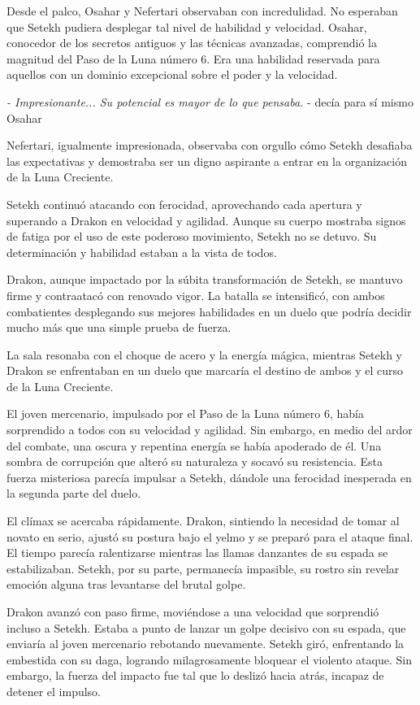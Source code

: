 Desde el palco, Osahar y Nefertari observaban con incredulidad. No esperaban que Setekh pudiera desplegar tal nivel de habilidad y velocidad. Osahar, conocedor de los secretos antiguos y las técnicas avanzadas, comprendió la magnitud del Paso de la Luna número 6. Era una habilidad reservada para aquellos con un dominio excepcional sobre el poder y la velocidad.

\textit{- Impresionante... Su potencial es mayor de lo que pensaba.} - decía para sí mismo Osahar

Nefertari, igualmente impresionada, observaba con orgullo cómo Setekh desafiaba las expectativas y demostraba ser un digno aspirante a entrar en la organización de la Luna Creciente.

Setekh continuó atacando con ferocidad, aprovechando cada apertura y superando a Drakon en velocidad y agilidad. Aunque su cuerpo mostraba signos de fatiga por el uso de este poderoso movimiento, Setekh no se detuvo. Su determinación y habilidad estaban a la vista de todos.

Drakon, aunque impactado por la súbita transformación de Setekh, se mantuvo firme y contraatacó con renovado vigor. La batalla se intensificó, con ambos combatientes desplegando sus mejores habilidades en un duelo que podría decidir mucho más que una simple prueba de fuerza.

La sala resonaba con el choque de acero y la energía mágica, mientras Setekh y Drakon se enfrentaban en un duelo que marcaría el destino de ambos y el curso de la Luna Creciente.

El joven mercenario, impulsado por el Paso de la Luna número 6, había sorprendido a todos con su velocidad y agilidad. Sin embargo, en medio del ardor del combate, una oscura y repentina energía se había apoderado de él. Una sombra de corrupción que alteró su naturaleza y socavó su resistencia. Esta fuerza misteriosa parecía impulsar a Setekh, dándole una ferocidad inesperada en la segunda parte del duelo.

El clímax se acercaba rápidamente. Drakon, sintiendo la necesidad de tomar al novato en serio, ajustó su postura bajo el yelmo y se preparó para el ataque final. El tiempo parecía ralentizarse mientras las llamas danzantes de su espada se estabilizaban. Setekh, por su parte, permanecía impasible, su rostro sin revelar emoción alguna tras levantarse del brutal golpe.

Drakon avanzó con paso firme, moviéndose a una velocidad que sorprendió incluso a Setekh. Estaba a punto de lanzar un golpe decisivo con su espada, que enviaría al joven mercenario rebotando nuevamente. Setekh giró, enfrentando la embestida con su daga, logrando milagrosamente bloquear el violento ataque. Sin embargo, la fuerza del impacto fue tal que lo deslizó hacia atrás, incapaz de detener el impulso.

